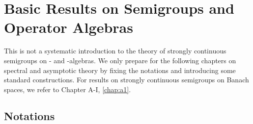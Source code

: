 
\chapter{Basic Results on Semigroups and Operator Algebras}\label{chap:D-I}

This is not a systematic introduction to the theory of strongly continuous semigroups on \CA- and \WA-algebras.
We only prepare for the following chapters on spectral and asymptotic theory by fixing the notations and introducing some standard constructions.
For results on strongly continuous semigroups on Banach spaces, we refer to Chapter A-I, \ref{chap:a1}.
\section{Notations}\label{sec:d1-1}
